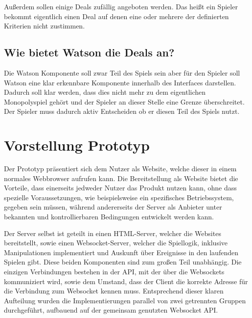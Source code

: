\documentclass[german]{cgspaper} %
\begin{document}
Außerdem sollen einige Deals zufällig angeboten werden.
Das heißt ein Spieler bekommt eigentlich einen Deal auf denen eine oder mehrere der definierten Kriterien nicht zustimmen.

\subsection{Wie bietet Watson die Deals an?}

Die Watson Komponente soll zwar Teil des Spiels sein aber für den Spieler soll Watson eine klar erkennbare Komponente innerhalb des Interfaces darstellen.
Dadurch soll klar werden, dass dies nicht mehr zu dem eigentlichen Monopolyspiel gehört und der Spieler an dieser Stelle eine Grenze überschreitet.
Der Spieler muss dadurch aktiv Entscheiden ob er diesen Teil des Spiels nutzt.

\section{Vorstellung Prototyp}

Der Prototyp präsentiert sich dem Nutzer als Website, welche dieser in einem normales Webbrowser aufrufen kann.
Die Bereitstellung als Website bietet die Vorteile, dass einerseits jedweder Nutzer das Produkt nutzen kann, ohne dass spezielle Voraussetzungen, wie beispielsweise ein spezifisches Betriebssystem, gegeben sein müssen, während andererseits der Server als Anbieter unter bekannten und kontrollierbaren Bedingungen entwickelt werden kann.

Der Server selbst ist geteilt in einen HTML-Server, welcher die Websites bereitstellt, sowie einen Websocket-Server, welcher die Spiellogik, inklusive Manipulationen implementiert und Auskunft über Ereignisse in den laufenden Spielen gibt.
Diese beiden Komponenten sind zum großen Teil unabhängig. Die einzigen Verbindungen bestehen in der API, mit der über die Websockets kommuniziert wird, sowie dem Umstand, dass der Client die korrekte Adresse für die Verbindung zum Websocket kennen muss.
Entsprechend dieser klaren Aufteilung wurden die Implementierungen parallel von zwei getrennten Gruppen durchgeführt, aufbauend auf der gemeinsam genutzten Websocket API.
\end{document}
